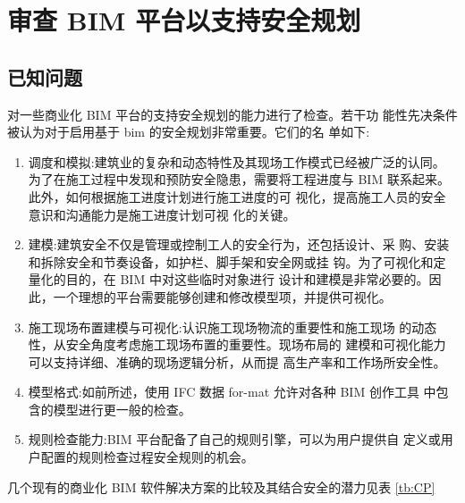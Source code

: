 \section{审查 BIM 平台以支持安全规划}
\subsection{已知问题}
对一些商业化 BIM 平台的支持安全规划的能力进行了检查。若干功
能性先决条件被认为对于启用基于 bim 的安全规划非常重要。它们的名
单如下:

\begin{enumerate}
    \item 调度和模拟:建筑业的复杂和动态特性及其现场工作模式已经被广泛的认同。
    为了在施工过程中发现和预防安全隐患，需要将工程进度与
    BIM 联系起来。此外，如何根据施工进度计划进行施工进度的可
    视化，提高施工人员的安全意识和沟通能力是施工进度计划可视
    化的关键。    
    \item 建模:建筑安全不仅是管理或控制工人的安全行为，还包括设计、采
    购、安装和拆除安全和节奏设备，如护栏、脚手架和安全网或挂
    钩。为了可视化和定量化的目的，在 BIM 中对这些临时对象进行
    设计和建模是非常必要的。因此，一个理想的平台需要能够创建和修改模型项，并提供可视化。
    \item 施工现场布置建模与可视化:认识施工现场物流的重要性和施工现场
    的动态性，从安全角度考虑施工现场布置的重要性。现场布局的
    建模和可视化能力可以支持详细、准确的现场逻辑分析，从而提
    高生产率和工作场所安全性。
    \item 模型格式:如前所述，使用 IFC 数据 for-mat 允许对各种 BIM 创作工具
    中包含的模型进行更一般的检查。
    \item 规则检查能力:BIM 平台配备了自己的规则引擎，可以为用户提供自
    定义或用户配置的规则检查过程安全规则的机会。
\end{enumerate}


几个现有的商业化 BIM 软件解决方案的比较及其结合安全的潜力见表 \ref{tb:CP}

